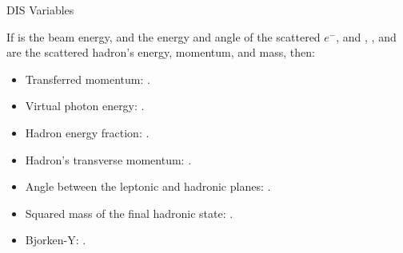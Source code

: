 \begin{frame}{DIS Variables}
    \label{12.14::dis_variables}

    \vspace{24pt}

    If  is the beam energy,  and  the energy and angle of the scattered $e^-$, and , , and  are the scattered hadron's energy, momentum, and mass, then:

    \vspace{12pt}

    \begin{itemize}
        \item
            Transferred momentum: .

        \item
            Virtual photon energy: .

        \item
            Hadron energy fraction: .

        \item
            Hadron's transverse momentum: .

        \item
            Angle between the leptonic and hadronic planes: .

        \item
            Squared mass of the final hadronic state: .

        \item
            Bjorken-Y: .
    \end{itemize}

\end{frame}
